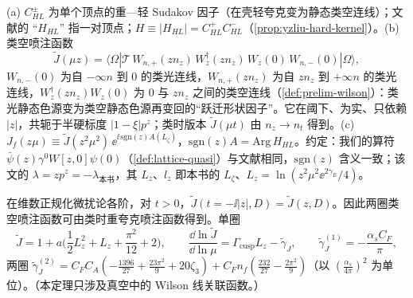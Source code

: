 \begin{definition}\label{def:yzliu-hl-jet}
(a) $C^\pm_{HL}$ 为单个顶点的重—轻 Sudakov 因子（在壳轻夸克变为静态类空连线）；文献\cite{Ji:2023pba}的 “$H_{HL}$” 指一对顶点；$H\equiv|H_{HL}|=C^+_{HL}C^-_{HL}$（\cref{prop:yzliu-hard-kernel}）。(b) 类空喷注函数 %
\begin{equation}\label{eq:yzliu-jet-def}
\tilde J(\mu z)=\langle\Omega|\mathcal T\,W_{n,+}(zn_z)\,W_z^\dagger(zn_z)\,W_z(0)\,W_{n,-}(0)|\Omega\rangle ,
\end{equation}
$W_{n,-}(0)$ 为自 $-\infty n$ 到 $0$ 的类光连线，$W_{n,+}(zn_z)$ 为自 $zn_z$ 到 $+\infty n$ 的类光连线，$W_z^\dagger(zn_z)W_z(0)$ 为 $0$ 与 $zn_z$ 之间的类空连线（\cref{def:prelim-wilson}）：类光静态色源变为类空静态色源再变回的“跃迁形状因子”。它在阈下、为实、只依赖 $|z|$，共轭于半硬标度 $|1-\xi|p^z$；类时版本 $\tilde J(\mu t)$ 由 $n_z\to n_t$ 得到。(c) $J_f(z\mu)\equiv\tilde J(z^2\mu^2)\,\ee^{\ii\,\mathrm{sgn}(z)A(L_\zeta)}$，$\mathrm{sgn}(z)A=\mathrm{Arg}\,H_{HL}$。约定：我们的算符 $\bar\psi(z)\gamma^0W[z,0]\psi(0)$（\cref{def:lattice-quasi}）与文献\cite{Ji:2023pba}相同，$\mathrm{sgn}(z)$ 含义一致；该文的 $\lambda=zp^z=-\lambda_{\text{本书}}$，其 $L_z$、$l_z$ 即本书的 $L_\zeta$、$L_z=\ln(z^2\mu^2\ee^{2\gamma_E}/4)$。
\end{definition}

\begin{theorem}\label{thm:yzliu-jet-continuation}
在维数正规化微扰论各阶，对 $t>0$，$\tilde J(t=-\ii|z|,D)=\tilde J(z,D)$。因此两圈类空喷注函数可由类时重夸克喷注函数\cite{Jain:2008gb}得到。单圈 %
\begin{equation}\label{eq:yzliu-jet-1loop}
\tilde J=1+a\Big(\frac12L_z^2+L_z+\frac{\pi^2}{12}+2\Big),\qquad \frac{\dd\ln\tilde J}{\dd\ln\mu}=\Gamma_{\mathrm{cusp}}L_z-\tilde\gamma_J,\qquad \tilde\gamma^{(1)}_J=-\frac{\alpha_sC_F}{\pi},
\end{equation}
两圈 $\tilde\gamma^{(2)}_J=C_FC_A(-\frac{1396}{27}+\frac{23\pi^2}9+20\zeta_3)+C_Fn_f(\frac{232}{27}-\frac{2\pi^2}9)$（以 $(\frac{\alpha_s}{4\pi})^2$ 为单位）。（本定理只涉及真空中的 Wilson 线关联函数。）
\end{theorem}

